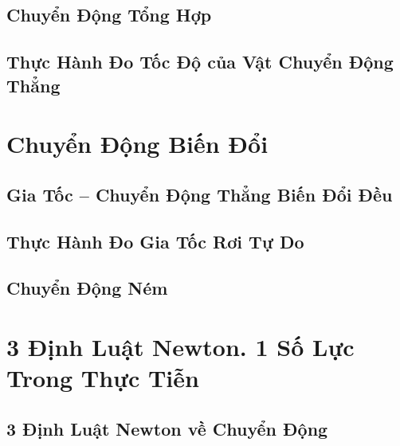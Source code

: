 \documentclass[oneside]{book}
\numberwithin{equation}{section}
\begin{document}

\section{Chuyển Động Tổng Hợp}


\section{Thực Hành Đo Tốc Độ của Vật Chuyển Động Thẳng}


\chapter{Chuyển Động Biến Đổi}

\section{Gia Tốc -- Chuyển Động Thẳng Biến Đổi Đều}


\section{Thực Hành Đo Gia Tốc Rơi Tự Do}


\section{Chuyển Động Ném}


\chapter{3 Định Luật Newton. 1 Số Lực Trong Thực Tiễn}

\section{3 Định Luật Newton về Chuyển Động}
\end{document}
